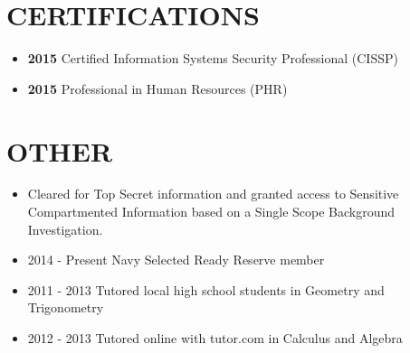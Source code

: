 \documentclass[10pt]{article}
\begin{document}
\section{CERTIFICATIONS}\label{certifications}

\begin{itemize}
\itemsep1pt\parskip0pt
\item
  \textbf{2015} Certified Information Systems Security Professional
  (CISSP)
\item
  \textbf{2015} Professional in Human Resources (PHR)
\end{itemize}

\section{OTHER}\label{other}

\begin{itemize}
\itemsep1pt\parskip0pt
\item
  Cleared for Top Secret information and granted access to Sensitive
  Compartmented Information based on a Single Scope Background
  Investigation.
\item
  2014 - Present Navy Selected Ready Reserve member
\item
  2011 - 2013 Tutored local high school students in Geometry and
  Trigonometry
\item
  2012 - 2013 Tutored online with tutor.com in Calculus and Algebra
\end{itemize}

\end{document}
